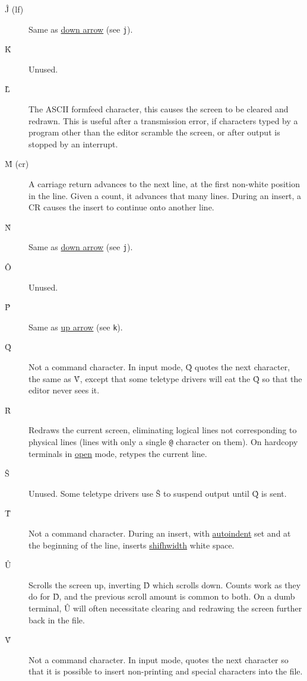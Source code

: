 \begin{description}
\item[\^{J} {\sc (lf)}] Same as \ul{down arrow} (see {\tt j}).

\item[\^{K}] Unused.

\item[\^{L}] The ASCII formfeed character, this causes the screen to be cleared
and redrawn. This is useful after a transmission error, if characters typed by
a program other than the editor scramble the screen, or after output is
stopped by an interrupt.

\item[\^{M} {\sc (cr)}] A carriage return advances to the next line, at the
first non-white position in the line. Given a count, it advances that many
lines. During an insert, a CR causes the insert to continue onto another
line.

\item[\^{N}] Same as \ul{down arrow} (see {\tt j}).

\item[\^{O}] Unused.

\item[\^{P}] Same as \ul{up arrow} (see {\tt k}).

\item[\^{Q}] Not a command character. In input mode, \^{Q} quotes the next
character, the same as \^{V}, except that some teletype drivers will eat the
\^{Q} so that the editor never sees it.

\item[\^{R}] Redraws the current screen, eliminating logical lines not
corresponding to physical lines (lines with only a single {\tt @} character on
them). On hardcopy terminals in \ul{open} mode, retypes the current line.

\item[\^{S}] Unused. Some teletype drivers use \^{S} to suspend output until
\^{Q} is sent.

\item[\^{T}] Not a command character. During an insert, with \ul{autoindent}
set and at the beginning of the line, inserts \ul{shifhwidth} white space.

\item[\^{U}] Scrolls the screen up, inverting \^{D} which scrolls down. Counts
work as they do for \^{D}, and the previous scroll amount is common to both.
On a dumb terminal, \^{U} will often necessitate clearing and redrawing the
screen further back in the file.

\item[\^{V}] Not a command character. In input mode, quotes the next character
so that it is possible to insert non-printing and special characters into the
file.


\end{description}
